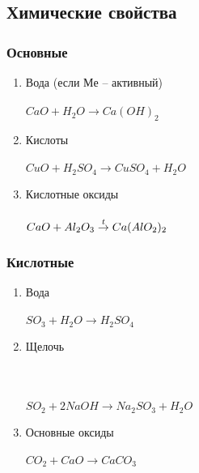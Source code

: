 \subsection{Химические свойства}
\subsubsection{Основные}
\begin{enumerate}
    \item Вода (если $Ме$ -- активный)\\
        \\
        $CaO + H_2O \rightarrow Ca(OH)_2$

    \item Кислоты\\
        \\
        $CuO + H_2SO_4 \rightarrow CuSO_4 + H_2O$

    \item Кислотные оксиды\\
        \\
        $CaO + Al_2O_3 \stackrel{t}{\rightarrow} Ca(AlO_2)_2$

\end{enumerate}


\subsubsection{Кислотные}
\begin{enumerate}
    \item Вода\\
        \\
        $SO_3 + H_2O \rightarrow H_2SO_4$

    \item Щелочь\\
        \\
        \\
        \\
        $SO_2 + 2NaOH \rightarrow Na_2SO_3 + H_2O$

    \item Основные оксиды\\
        \\
        $CO_2 + CaO \rightarrow CaCO_3$
\end{enumerate}
